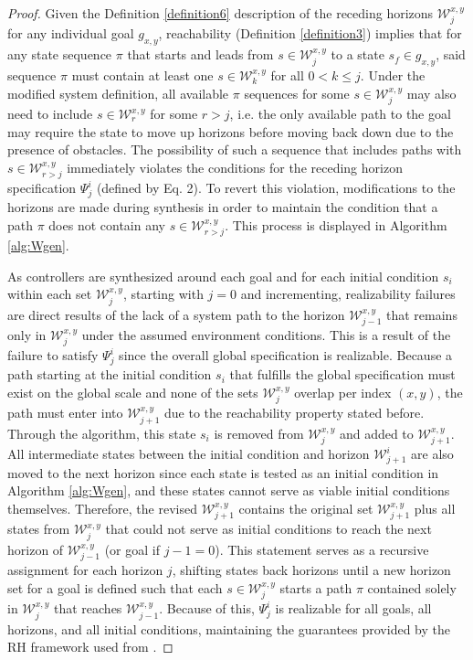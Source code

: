 \documentclass[journal]{IEEEtran}
\begin{document}
\begin{proof}
Given the Definition \ref{definition6} description of the receding horizons $\mathcal{W}^{x,y}_j$ for any individual goal $g_{x,y}$, reachability (Definition \ref{definition3}) implies that for any state sequence $\pi$ that starts and leads from $s \in \mathcal{W}^{x,y}_j$ to a state $s_f \in g_{x,y}$, said sequence $\pi$ must contain at least one $s \in \mathcal{W}^{x,y}_k$ for all $0 < k \le j$. Under the modified system definition, all available $\pi$ sequences for some $s \in \mathcal{W}^{x,y}_j$ may also need to include $s \in \mathcal{W}^{x,y}_r$ for some $r > j$, i.e. the only available path to the goal may require the state to move up horizons before moving back down due to the presence of obstacles. The possibility of such a sequence that includes paths with $s \in \mathcal{W}^{x,y}_{r > j}$ immediately violates the conditions for the receding horizon specification $\Psi_{j}^{i}$ (defined by Eq. 2). To revert this violation, modifications to the horizons are made during synthesis in order to maintain the condition that a path $\pi$ does not contain any $s \in \mathcal{W}^{x,y}_{r > j}$. This process is displayed in Algorithm \ref{alg:Wgen}.			

As controllers are synthesized around each goal and for each initial condition $s_i$ within each set $\mathcal{W}^{x,y}_j$, starting with $j = 0$ and incrementing, realizability failures are direct results of the lack of a system path to the horizon $\mathcal{W}^{x,y}_{j-1}$ that remains only in $\mathcal{W}^{x,y}_{j}$ under the assumed environment conditions. This is a result of the failure to satisfy $\Psi_{j}^{i}$ since the overall global specification is realizable. Because a path starting at the initial condition $s_i$ that fulfills the global specification must exist on the global scale and none of the sets $\mathcal{W}^{x,y}_j$ overlap per index $(x,y)$, the path must enter into $\mathcal{W}^{x,y}_{j+1}$ due to the reachability property stated before. Through the algorithm, this state $s_i$ is removed from $\mathcal{W}^{x,y}_{j}$ and added to $\mathcal{W}^{x,y}_{j+1}$. All intermediate states between the initial condition and horizon $\mathcal{W}^i_{j+1}$ are also moved to the next horizon since each state is tested as an initial condition in Algorithm \ref{alg:Wgen}, and these states cannot serve as viable initial conditions themselves. Therefore, the revised $\mathcal{W}^{x,y}_{j+1}$ contains the original set $\mathcal{W}^{x,y}_{j+1}$ plus all states from $\mathcal{W}^{x,y}_{j}$ that could not serve as initial conditions to reach the next horizon of $\mathcal{W}^{x,y}_{j-1}$ (or goal if $j-1 = 0$). This statement serves as a recursive assignment for each horizon $j$, shifting states back horizons until a new horizon set for a goal is defined such that each $s \in \mathcal{W}^{x,y}_{j}$ starts a path $\pi$ contained solely in $\mathcal{W}^{x,y}_{j}$ that reaches $\mathcal{W}^{x,y}_{j-1}$. Because of this, $\Psi_{j}^{i}$ is realizable for all goals, all horizons, and all initial conditions, maintaining the guarantees provided by the RH framework used from \cite{c10}.
\end{proof}
\end{document}
